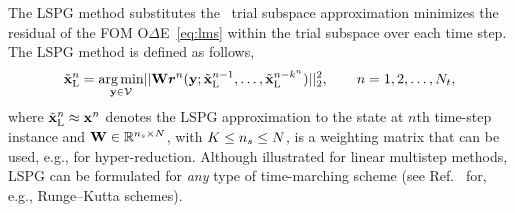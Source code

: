 \documentclass[3p,computermodern,10pt]{elsarticle}
\begin{document}
The LSPG method substitutes the \spatialAcronym\ trial subspace approximation
minimizes the residual of the FOM O$\Delta$E~\eqref{eq:lms} within the trial subspace over each time step. %
The LSPG method is defined as follows,
\begin{equation*}
\tilde{\mathbf{x}}_{\text{L}}^n = \underset{\mathbf{y} \in \mathcal{V }  }{\text{arg\,min}}|| \mathbf{W}\boldsymbol r_{}^{n} (\mathbf{y}; \tilde{\mathbf{x}}_{\text{L}}^{n-1},\ldots,\tilde{\mathbf{x}}_{\text{L}}^{n-k^n}) ||_2^2, \qquad n = 1,2,\hdots,N_t,
\end{equation*}
where $\tilde{\mathbf{x}}_{\text{L}}^n \approx {\mathbf{x}}^{n}$ denotes the LSPG approximation to the state at $n$th time-step instance and 
$\mathbf{W} \in \mathbb{R}^{n_s \times N}$, with $K \le n_s \le N$, is a weighting matrix that can be used, e.g., for hyper-reduction. 
Although illustrated for linear multistep methods, LSPG can be 
formulated for \textit{any} type of time-marching scheme (see Ref.~\cite{carlberg_lspg_v_galerkin} for, e.g., Runge--Kutta schemes). 
\end{document}
